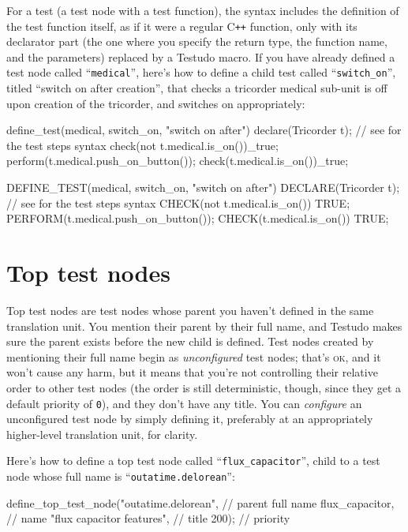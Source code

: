 \documentclass[twoside, a4paper, article]{memoir}
\newcommand*\Cpp{C\texttt{++}}
\begin{document}
For a test (a test node with a test function), the syntax includes the
definition of the test function itself, as if it were a regular \Cpp{}
function, only with its declarator part (the one where you specify the return
type, the function name, and the parameters) replaced by a Testudo macro.  If
you have already defined a test node called ``\texttt{medical}'', here's how to
define a child test called ``\texttt{switch\_on}'', titled ``switch on after
creation'', that checks a tricorder medical sub-unit is off upon creation of the
tricorder, and switches on appropriately:
\begin{cpplisting}
define_test(medical, switch_on, "switch on after") {
  declare(Tricorder t); // see  for the test steps syntax
  check(not t.medical.is_on())_true;
  perform(t.medical.push_on_button());
  check(t.medical.is_on())_true;
}
\end{cpplisting}

\begin{cpplisting}
DEFINE_TEST(medical, switch_on, "switch on after")
{
  DECLARE(Tricorder t); // see  for the test steps syntax
  CHECK(not t.medical.is_on()) TRUE;
  PERFORM(t.medical.push_on_button());
  CHECK(t.medical.is_on()) TRUE;
}
\end{cpplisting}

\section{Top test nodes}
\label{sec:top-test-nodes}

Top test nodes are test nodes whose parent you haven't defined in the same
translation unit.  You mention their parent by their full name, and Testudo
makes sure the parent exists before the new child is defined.  Test nodes
created by mentioning their full name begin as \emph{unconfigured} test nodes;
that's \textsc{ok}, and it won't cause any harm, but it means that you're not
controlling their relative order to other test nodes (the order is still
deterministic, though, since they get a default priority of \texttt{0}), and
they don't have any title.  You can \emph{configure} an unconfigured test node
by simply defining it, preferably at an appropriately higher-level translation
unit, for clarity.

Here's how to define a top test node called ``\texttt{flux\_capacitor}'', child
to a test node whose full name is ``\texttt{outatime.delorean}'':
\begin{cpplisting}
define_top_test_node("outatime.delorean", // parent full name
                     flux_capacitor, // name
                     "flux capacitor features", // title
                     200); // priority
\end{cpplisting}
\end{document}

